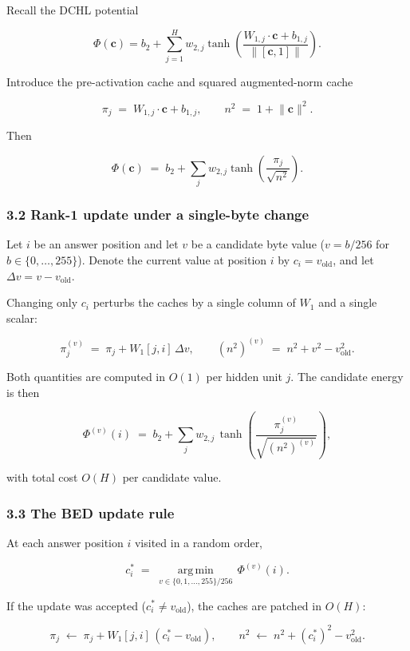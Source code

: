 \documentclass[
  11pt,
  a4paper,
]{article}
\begin{document}
Recall the DCHL potential

\[
\Phi(\mathbf{c}) = b_2 + \sum_{j=1}^H w_{2,j} \tanh\!\left( \frac{W_{1,j} \cdot \mathbf{c} + b_{1,j}}{\lVert [\mathbf{c}, 1] \rVert} \right).
\]

Introduce the pre-activation cache and squared augmented-norm cache

\[
\pi_j \;=\; W_{1,j} \cdot \mathbf{c} + b_{1,j}, \qquad n^2 \;=\; 1 + \lVert \mathbf{c} \rVert^2.
\]

Then

\[
\Phi(\mathbf{c}) \;=\; b_2 + \sum_j w_{2,j} \tanh\!\left( \frac{\pi_j}{\sqrt{n^2}} \right).
\]

\subsubsection{3.2 Rank-1 update under a single-byte
change}\label{rank-1-update-under-a-single-byte-change}

Let \(i\) be an answer position and let \(v\) be a candidate byte value
(\(v = b/256\) for \(b \in \{0,\dots,255\}\)). Denote the current value
at position \(i\) by \(c_i = v_{\text{old}}\), and let
\(\Delta v = v - v_{\text{old}}\).

Changing only \(c_i\) perturbs the caches by a single column of \(W_1\)
and a single scalar:

\[
\pi_j^{(v)} \;=\; \pi_j + W_1[j, i] \, \Delta v, \qquad
(n^2)^{(v)} \;=\; n^2 + v^2 - v_{\text{old}}^2.
\]

Both quantities are computed in \(O(1)\) per hidden unit \(j\). The
candidate energy is then

\[
\Phi^{(v)}(i) \;=\; b_2 + \sum_j w_{2,j} \, \tanh\!\left( \frac{\pi_j^{(v)}}{\sqrt{(n^2)^{(v)}}} \right),
\]

with total cost \(O(H)\) per candidate value.

\subsubsection{3.3 The BED update rule}\label{the-bed-update-rule}

At each answer position \(i\) visited in a random order,

\[
c_i^{\ast} \;=\; \operatorname*{arg\,min}_{v \in \{0, 1, \dots, 255\}/256}\, \Phi^{(v)}(i).
\]

If the update was accepted (\(c_i^{\ast} \neq v_{\text{old}}\)), the
caches are patched in \(O(H)\):

\[
\pi_j \;\leftarrow\; \pi_j + W_1[j, i] \, (c_i^{\ast} - v_{\text{old}}), \qquad
n^2 \;\leftarrow\; n^2 + (c_i^{\ast})^2 - v_{\text{old}}^2.
\]
\end{document}
